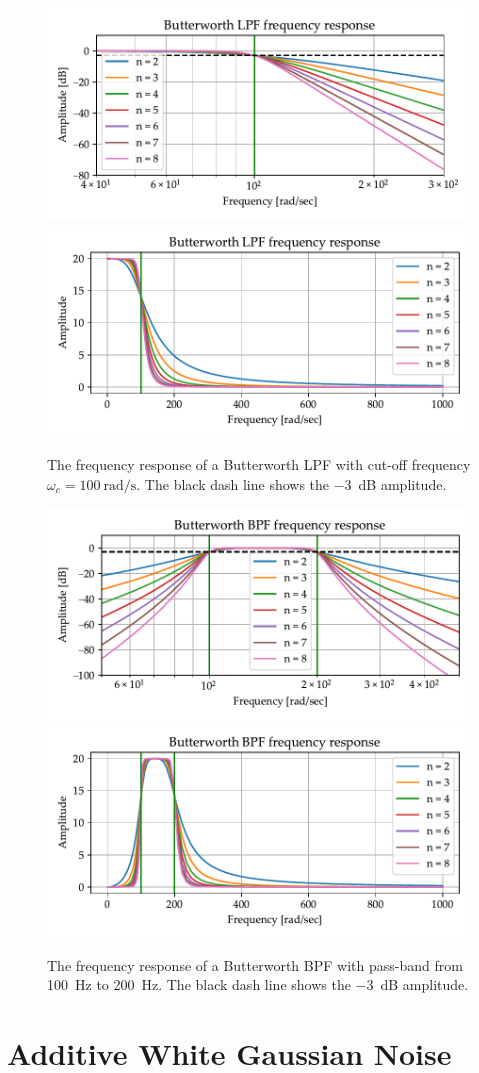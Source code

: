\documentclass[../ECE459FinalProjectReport.tex]{subfiles}
\begin{document}
\begin{figure}[htb]
    \centering
    \includegraphics[width=0.45\linewidth]{plots/butterworth-lpf.pdf}
    \includegraphics[width=0.45\linewidth]{plots/butterworth-lpf-nolog.pdf}
    \caption{The frequency response of a Butterworth LPF with cut-off frequency $\omega_c = \SI{100}{\radian\per\s}$. The black dash line shows the \SI{-3}{\dB} amplitude.}
    \label{fig:butter-lpf}
\end{figure}
\begin{figure}[htb]
    \centering
    \includegraphics[width=0.45\linewidth]{plots/butterworth-bpf.pdf}
    \includegraphics[width=0.45\linewidth]{plots/butterworth-bpf-nolog.pdf}
    \caption{The frequency response of a Butterworth BPF with pass-band from \SI{100}{Hz} to \SI{200}{Hz}. The black dash line shows the \SI{-3}{\dB} amplitude.}
    \label{fig:butter-bpf}
\end{figure}


\section{Additive White Gaussian Noise}
\end{document}
